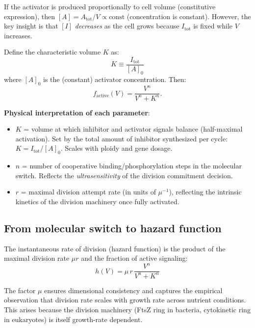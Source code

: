 \documentclass[11pt]{article}
\begin{document}
If the activator is produced proportionally to cell volume (constitutive expression), then $[A] = A_{\mathrm{tot}}/V \propto \text{const}$ (concentration is constant). However, the key insight is that $[I]$ \emph{decreases} as the cell grows because $I_{\mathrm{tot}}$ is fixed while $V$ increases.

Define the characteristic volume $K$ as:
\begin{equation}
  K \equiv \frac{I_{\mathrm{tot}}}{[A]_0}
  \label{eq:K_def}
\end{equation}
where $[A]_0$ is the (constant) activator concentration. Then:
\begin{equation}
  f_{\mathrm{active}}(V) = \frac{V^n}{V^n + K^n}.
  \label{eq:f_active}
\end{equation}

\textbf{Physical interpretation of each parameter}:
\begin{itemize}
  \item $K$ = volume at which inhibitor and activator signals balance (half-maximal activation). Set by the total amount of inhibitor synthesized per cycle: $K = I_{\mathrm{tot}}/[A]_0$. Scales with ploidy and gene dosage.
  \item $n$ = number of cooperative binding/phosphorylation steps in the molecular switch. Reflects the \emph{ultrasensitivity} of the division commitment decision.
  \item $r$ = maximal division attempt rate (in units of $\mu^{-1}$), reflecting the intrinsic kinetics of the division machinery once fully activated.
\end{itemize}

\subsection{From molecular switch to hazard function}

The instantaneous rate of division (hazard function) is the product of the maximal division rate $\mu r$ and the fraction of active signaling:
\begin{equation}
  \boxed{h(V) = \mu\, r\, \frac{V^n}{V^n + K^n}}
  \label{eq:hazard}
\end{equation}

The factor $\mu$ ensures dimensional consistency and captures the empirical observation that division rate scales with growth rate across nutrient conditions. This arises because the division machinery (FtsZ ring in bacteria, cytokinetic ring in eukaryotes) is itself growth-rate dependent.
\end{document}
